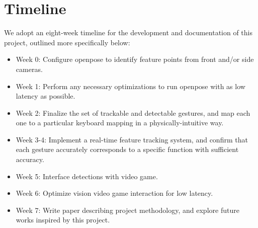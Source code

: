 \documentclass[10pt,twocolumn,letterpaper]{article}
\begin{document}
\section{Timeline}
We adopt an eight-week timeline for the development and documentation of this project, outlined 
more specifically below:
\begin{itemize}
    \item Week 0: Configure openpose to identify feature points from front and/or side cameras.
    \item Week 1: Perform any necessary optimizations to run openpose with as low latency as possible.
    \item Week 2: Finalize the set of trackable and detectable gestures, and map each one to a particular keyboard mapping in a physically-intuitive way.
    \item Week 3-4: Implement a real-time feature tracking system, and confirm that each gesture accurately corresponds to a specific function with sufficient accuracy.
    \item Week 5: Interface detections with video game.
    \item Week 6: Optimize vision video game interaction for low latency.
    \item Week 7: Write paper describing project methodology, and explore future works inspired by this project.
\end{itemize}

{\small


}
\end{document}
